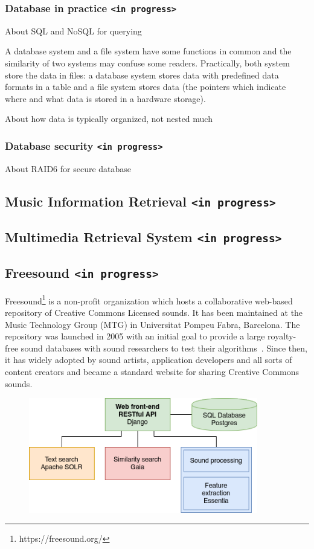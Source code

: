 \subsubsection{Database in practice \texttt{<in progress>}}
About SQL and NoSQL for querying

A database system and a file system have some functions in common and the similarity of two systems may confuse some readers. Practically, both system store the data in files: a database system stores data with predefined data formats in a table and a file system stores data (the pointers which indicate where and what data is stored in a hardware storage).

About how data is typically organized, not nested much
%
\subsubsection{Database security \texttt{<in progress>}}
About RAID6 for secure database

\subsection{Music Information Retrieval \texttt{<in progress>}}


\subsection{Multimedia Retrieval System \texttt{<in progress>}}

\subsection{Freesound \texttt{<in progress>}}
Freesound\footnote{https://freesound.org/} is a non-profit organization which hosts a collaborative web-based repository of Creative Commons Licensed sounds. It has been maintained at the Music Technology Group (MTG) in Universitat Pompeu Fabra, Barcelona. The repository was launched in 2005 with an initial goal to provide a large royalty-free sound databases with sound researchers to test their algorithms~\cite{frederic2013}. Since then, it has widely adopted by sound artists, application developers and all sorts of content creators and became a standard website for sharing Creative Commons sounds.


\begin{figure}[htb]
	\centering
	\includegraphics[width=10cm]{Figures/freesound_api.png}
	\caption{}
	\label{freesound-api}
\end{figure}


